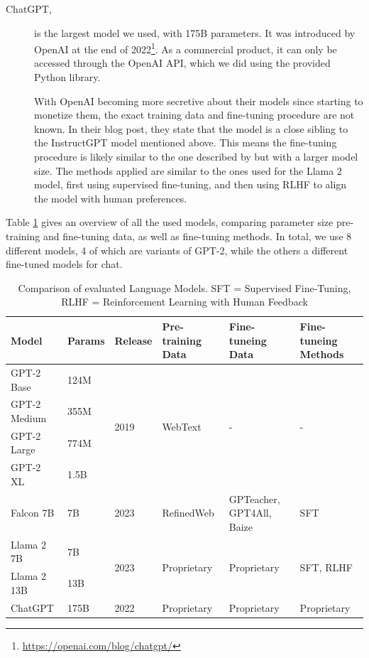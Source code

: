\begin{description}
\item[ChatGPT,] is the largest model we used, with 175B parameters. 
It was introduced by OpenAI at the end of 2022\footnote{\url{https://openai.com/blog/chatgpt/}}.
As a commercial product, it can only be accessed through the OpenAI API, which we did using the provided Python library.

With OpenAI becoming more secretive about their models since starting to monetize them, the exact training data and fine-tuning procedure are not known.
In their blog post, they state that the model is a close sibling to the InstructGPT model mentioned above.
This means the fine-tuning procedure is likely similar to the one described by \cite{ouyang:2022:Training} but with a larger model size.
The methods applied are similar to the ones used for the Llama 2 model, first using supervised fine-tuning, and then using RLHF to align the model with human preferences.
\end{description}

Table \ref{tab:language-models} gives an overview of all the used models, comparing parameter size pre-training and fine-tuning data, as well as fine-tuning methods.
In total, we use 8 different models, 4 of which are variants of GPT-2, while the others a different fine-tuned models for chat.
\begin{table}[tb]
\centering
\begin{tabularx}{\textwidth}{lllXXX}
\hline
\textbf{Model} & \textbf{Params} & \textbf{Release} & \textbf{Pre-training Data} & \textbf{Fine-tuneing Data} & \textbf{Fine-tuneing Methods} \\
\hline
GPT-2 Base    & 124M & \multirow{4}{*}{2019} & \multirow{4}{*}{WebText} & \multirow{4}{*}{-} & \multirow{4}{*}{-} \\
GPT-2 Medium  & 355M &                      &                          &  &  \\
GPT-2 Large   & 774M &                      &                          &  &  \\
GPT-2 XL      & 1.5B &                      &                          &  &  \\
\hline
Falcon 7B              & 7B      & 2023 & RefinedWeb           & GPTeacher, GPT4All, Baize & SFT \\
\hline
Llama 2 7B & 7B    & \multirow{2}{*}{2023} & \multirow{2}{*}{Proprietary} & \multirow{2}{*}{Proprietary} & \multirow{2}{*}{SFT, RLHF} \\
Llama 2 13B   & 13B   &  &                        &                         &  \\
\hline
ChatGPT                & 175B   & 2022 & Proprietary                & Proprietary & Proprietary \\
\hline
\end{tabularx}
\caption{Comparison of evaluated Language Models. SFT = Supervised Fine-Tuning, RLHF = Reinforcement Learning with Human Feedback}\label{tab:language-models}
\end{table}

